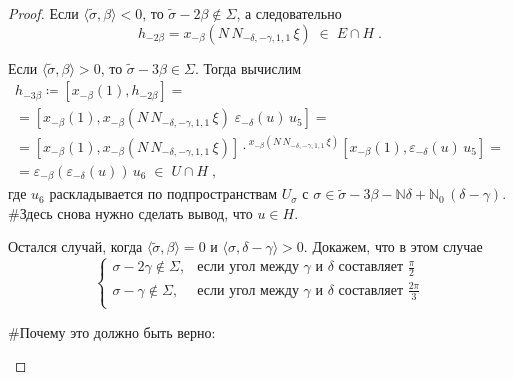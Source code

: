 \documentclass[10pt]{article}
\theoremstyle{remark}
\newcommand{\N}{\mathbb{N}}
\begin{document}
\begin{proof}
Если $\langle\widetilde\sigma,\beta\rangle<0$, то $\widetilde\sigma-2\beta\notin\Sigma$, а следовательно
$$h_{-2\beta} = x_{-\beta}(N \, N_{-\delta,-\gamma,1,1} \, \xi) \; \in \; E \cap H \;.$$

Если $\langle\widetilde\sigma,\beta\rangle>0$, то $\widetilde\sigma-3\beta\in\Sigma$. Тогда вычислим
\begin{multline*}
h_{-3\beta} \coloneqq [x_{-\beta}(1),h_{-2\beta}] = \\ =
[x_{-\beta}(1), x_{-\beta}(N \, N_{-\delta,-\gamma,1,1} \, \xi) \; \varepsilon_{-\delta}(u)\,u_5] = \\ =
[x_{-\beta}(1), x_{-\beta}(N \, N_{-\delta,-\gamma,1,1} \, \xi)] \cdot {}^{x_{-\beta}(N \, N_{-\delta,-\gamma,1,1} \, \xi)}[x_{-\beta}(1),\varepsilon_{-\delta}(u)\,u_5] = \\ =
\varepsilon_{-\beta}(\varepsilon_{-\delta}(u))\,u_6 \; \in \; U \cap H
 \; ,
\end{multline*}
где $u_6$ раскладывается по подпространствам $U_\sigma$ с $\sigma \in \widetilde\sigma-3\beta - \N\delta + \N_0 \, (\delta-\gamma)$. \#Здесь снова нужно сделать вывод, что $u\in H$.

Остался случай, когда $\langle\widetilde\sigma,\beta\rangle=0$ и $\langle\sigma,\delta-\gamma\rangle>0$. Докажем, что в этом случае 
$$
\begin{cases}
  \sigma-2\gamma\notin\Sigma,& \text{если угол между } \gamma \text{ и } \delta \text{ составляет } \frac{\pi}{2}\\
  \sigma-\gamma\notin\Sigma,              & \text{если угол между } \gamma \text{ и } \delta \text{ составляет } \frac{2\pi}{3}\\
\end{cases}$$

\#Почему это должно быть верно:

\begin{center}
\newcommand{\point}[1]{node (#1) [circle,inner sep=1,fill] {}}
\newcommand{\pointroot}[1]{node (#1) [circle,inner sep=2,fill=blue] {}}
\newcommand{\pointweight}[1]{node (#1) [circle,inner sep=2,fill=olive] {}}
\newcommand{\pointnotweight}[1]{node (#1) [circle,inner sep=2,fill=red] {}}

\end{center}
\end{proof}
\end{document}
